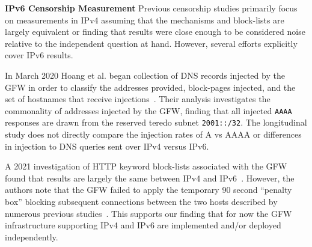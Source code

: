 \textbf{IPv6 Censorship Measurement}
Previous censorship studies primarily focus on measurements in IPv4
assuming that the mechanisms and block-lists are largely equivalent or finding
that results were close enough to be considered noise relative to the independent
question at hand. However, several efforts explicitly cover IPv6 results.

In March 2020 Hoang et al. began collection of DNS records injected by the GFW in order to
classify the addresses provided, block-pages injected, and the set of hostnames
that receive injections~\cite{USESEC21:GFWatch}. Their analysis investigates the
commonality of addresses injected by the GFW, finding that all injected
\texttt{AAAA} responses are drawn from the reserved teredo subnet \texttt{2001::/32}.
The longitudinal study does not directly compare the injection rates
of A vs AAAA or differences in injection to DNS queries sent over IPv4 versus IPv6.

A 2021 investigation of HTTP keyword block-lists associated with the GFW
found that results are largely the same between IPv4 and IPv6~\cite{weinberg2021chinese}.
However, the authors note that the GFW failed to apply the temporary 90 second ``penalty box''
blocking subsequent connections between the two hosts described by numerous
previous studies~\cite{xu2011internet,clayton2006ignoring}. This supports our finding
that for now the GFW infrastructure supporting IPv4 and IPv6 are implemented
and/or deployed independently.
